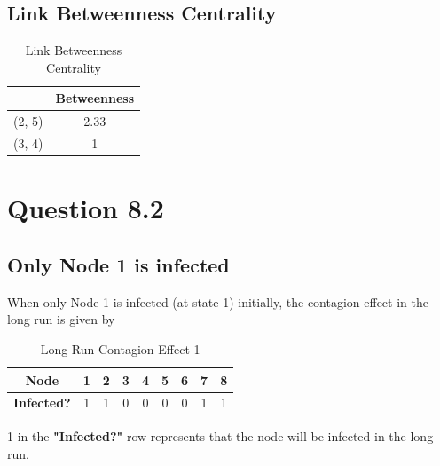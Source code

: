\documentclass[]{article}
\begin{document}
\subsection*{Link Betweenness Centrality}

\begin{table}[htbp]
	\centering
	\caption{Link Betweenness Centrality}
	\begin{tabular}{|cc|}
		\toprule
		\rowcolor[rgb]{ .267,  .447,  .769} \multicolumn{1}{|l}{\textcolor[rgb]{ 1,  1,  1}{\textbf{Links}}} & \multicolumn{1}{l|}{\textcolor[rgb]{ 1,  1,  1}{\textbf{Betweenness}}} \\
		\midrule
		(2, 5) & 2.33 \\
		\midrule
		(3, 4) & 1 \\
		\bottomrule
	\end{tabular}
	\label{table:Link_Betweenness_Centrality}
\end{table}


\newpage
\section*{Question 8.2}

\subsection*{Only Node 1 is infected}
When only Node 1 is infected (at state 1) initially, the contagion effect in the long run is given by

\begin{table}[htbp]
	\centering
	\caption{Long Run Contagion Effect 1}
	\begin{tabular}{|ccccccccc|}
		\toprule
		\rowcolor[rgb]{ .267,  .447,  .769} \textcolor[rgb]{ 1,  1,  1}{\textbf{Node}} & \textcolor[rgb]{ 1,  1,  1}{\textbf{1}} & \textcolor[rgb]{ 1,  1,  1}{\textbf{2}} & \textcolor[rgb]{ 1,  1,  1}{\textbf{3}} & \textcolor[rgb]{ 1,  1,  1}{\textbf{4}} & \textcolor[rgb]{ 1,  1,  1}{\textbf{5}} & \textcolor[rgb]{ 1,  1,  1}{\textbf{6}} & \textcolor[rgb]{ 1,  1,  1}{\textbf{7}} & \textcolor[rgb]{ 1,  1,  1}{\textbf{8}} \\
		\midrule
		\textbf{Infected?} & 1     & 1     & 0     & 0     & 0     & 0     & 1     & 1 \\
		\bottomrule
	\end{tabular}
	\label{table:contagion_1}
\end{table}

1 in the \textbf{"Infected?"} row represents that the node will be infected in the long run.
\end{document}
